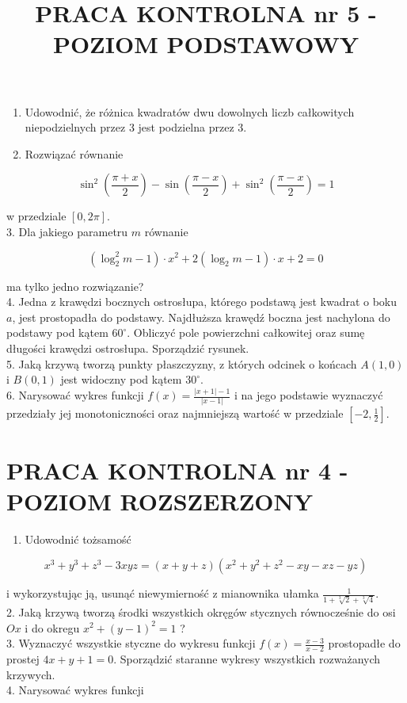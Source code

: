 \documentclass[10pt]{article}
\title{PRACA KONTROLNA nr 5 - POZIOM PODSTAWOWY }
\author{}
\date{}
\begin{document}
\maketitle
\begin{enumerate}
  \item Udowodnić, że różnica kwadratów dwu dowolnych liczb całkowitych niepodzielnych przez 3 jest podzielna przez 3.
  \item Rozwiązać równanie
\end{enumerate}

$$
\sin ^{2}\left(\frac{\pi+x}{2}\right)-\sin \left(\frac{\pi-x}{2}\right)+\sin ^{2}\left(\frac{\pi-x}{2}\right)=1
$$

w przedziale $[0,2 \pi]$.\\
3. Dla jakiego parametru $m$ równanie

$$
\left(\log _{2}^{2} m-1\right) \cdot x^{2}+2\left(\log _{2} m-1\right) \cdot x+2=0
$$

ma tylko jedno rozwiązanie?\\
4. Jedna z krawędzi bocznych ostrosłupa, którego podstawą jest kwadrat o boku $a$, jest prostopadła do podstawy. Najdłuższa krawędź boczna jest nachylona do podstawy pod kątem $60^{\circ}$. Obliczyć pole powierzchni całkowitej oraz sumę długości krawędzi ostrosłupa. Sporządzić rysunek.\\
5. Jaką krzywą tworzą punkty płaszczyzny, z których odcinek o końcach $A(1,0)$ i $B(0,1)$ jest widoczny pod kątem $30^{\circ}$.\\
6. Narysować wykres funkcji $f(x)=\frac{|x+1|-1}{|x-1|}$ i na jego podstawie wyznaczyć przedziały jej monotoniczności oraz najmniejszą wartość w przedziale $\left[-2, \frac{1}{2}\right]$.

\section*{PRACA KONTROLNA nr 4 - POZIOM ROZSZERZONY}
\begin{enumerate}
  \item Udowodnić tożsamość
\end{enumerate}

$$
x^{3}+y^{3}+z^{3}-3 x y z=(x+y+z)\left(x^{2}+y^{2}+z^{2}-x y-x z-y z\right)
$$

i wykorzystując ją, usunąć niewymierność z mianownika ułamka $\frac{1}{1+\sqrt[3]{2}+\sqrt[3]{4}}$.\\
2. Jaką krzywą tworzą środki wszystkich okręgów stycznych równocześnie do osi $O x$ i do okregu $x^{2}+(y-1)^{2}=1$ ?\\
3. Wyznaczyć wszystkie styczne do wykresu funkcji $f(x)=\frac{x-3}{x-2}$ prostopadłe do prostej $4 x+y+1=0$. Sporządzić staranne wykresy wszystkich rozważanych krzywych.\\
4. Narysować wykres funkcji
\end{document}
